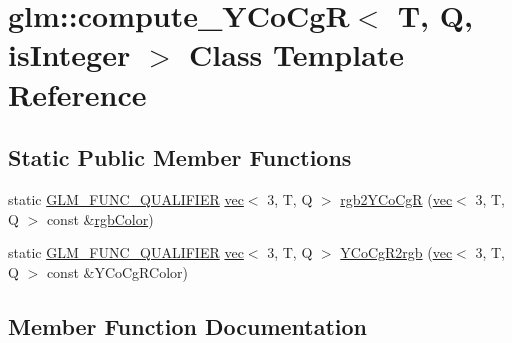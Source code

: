 \hypertarget{classglm_1_1compute___y_co_cg_r}{}\section{glm\+:\+:compute\+\_\+\+Y\+Co\+CgR$<$ T, Q, is\+Integer $>$ Class Template Reference}
\label{classglm_1_1compute___y_co_cg_r}
\subsection*{Static Public Member Functions}
\begin{DoxyCompactItemize}
\item 
static \mbox{\hyperlink{setup_8hpp_a33fdea6f91c5f834105f7415e2a64407}{G\+L\+M\+\_\+\+F\+U\+N\+C\+\_\+\+Q\+U\+A\+L\+I\+F\+I\+ER}} \mbox{\hyperlink{structglm_1_1vec}{vec}}$<$ 3, T, Q $>$ \mbox{\hyperlink{classglm_1_1compute___y_co_cg_r_a54c896f58edbb8d14d522358dde783a9}{rgb2\+Y\+Co\+CgR}} (\mbox{\hyperlink{structglm_1_1vec}{vec}}$<$ 3, T, Q $>$ const \&\mbox{\hyperlink{group__gtx__color__space_ga5f9193be46f45f0655c05a0cdca006db}{rgb\+Color}})
\item 
static \mbox{\hyperlink{setup_8hpp_a33fdea6f91c5f834105f7415e2a64407}{G\+L\+M\+\_\+\+F\+U\+N\+C\+\_\+\+Q\+U\+A\+L\+I\+F\+I\+ER}} \mbox{\hyperlink{structglm_1_1vec}{vec}}$<$ 3, T, Q $>$ \mbox{\hyperlink{classglm_1_1compute___y_co_cg_r_a90eb0aada34098a657429dea2323e00a}{Y\+Co\+Cg\+R2rgb}} (\mbox{\hyperlink{structglm_1_1vec}{vec}}$<$ 3, T, Q $>$ const \&Y\+Co\+Cg\+R\+Color)
\end{DoxyCompactItemize}


\subsection{Member Function Documentation}
\mbox{\label{classglm_1_1compute___y_co_cg_r_a54c896f58edbb8d14d522358dde783a9}} 
